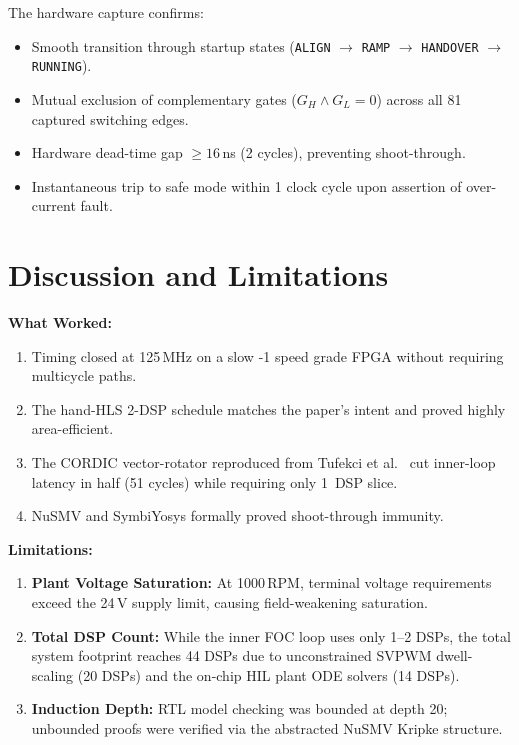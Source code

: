 \documentclass[11pt,a4paper]{article}
\begin{document}
The hardware capture confirms:
\begin{itemize}
  \item Smooth transition through startup states (\texttt{ALIGN} $\to$ \texttt{RAMP} $\to$ \texttt{HANDOVER} $\to$ \texttt{RUNNING}).
  \item Mutual exclusion of complementary gates ($G_H \wedge G_L = 0$) across all 81 captured switching edges.
  \item Hardware dead-time gap $\ge 16$\,ns (2 cycles), preventing shoot-through.
  \item Instantaneous trip to safe mode within 1 clock cycle upon assertion of over-current fault.
\end{itemize}

\section{Discussion and Limitations}
\label{sec:discussion}

\textbf{What Worked:}
\begin{enumerate}
  \item Timing closed at 125\,MHz on a slow -1 speed grade FPGA without requiring multicycle paths.
  \item The hand-HLS 2-DSP schedule matches the paper's intent and proved highly area-efficient.
  \item The CORDIC vector-rotator reproduced from Tufekci et al.~\cite{tufekci2020} cut inner-loop latency in half (51 cycles) while requiring only 1~DSP slice.
  \item NuSMV and SymbiYosys formally proved shoot-through immunity.
\end{enumerate}

\textbf{Limitations:}
\begin{enumerate}
  \item \textbf{Plant Voltage Saturation:} At 1000\,RPM, terminal voltage requirements exceed the 24\,V supply limit, causing field-weakening saturation.
  \item \textbf{Total DSP Count:} While the inner FOC loop uses only 1--2 DSPs, the total system footprint reaches 44 DSPs due to unconstrained SVPWM dwell-scaling (20 DSPs) and the on-chip HIL plant ODE solvers (14 DSPs).
  \item \textbf{Induction Depth:} RTL model checking was bounded at depth 20; unbounded proofs were verified via the abstracted NuSMV Kripke structure.
\end{enumerate}
\end{document}

